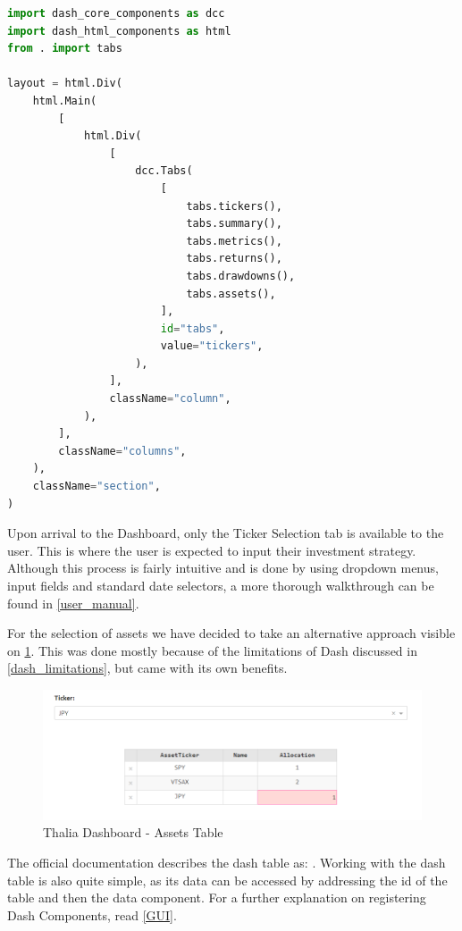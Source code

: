 \documentclass[main.tex]{subfiles}
\begin{document}
\begin{lstlisting}[language=Python, caption=layout.py - Example of Dash Code, label=lst:dash_code]
import dash_core_components as dcc
import dash_html_components as html
from . import tabs

layout = html.Div(
    html.Main(
        [
            html.Div(
                [
                    dcc.Tabs(
                        [
                            tabs.tickers(),
                            tabs.summary(),
                            tabs.metrics(),
                            tabs.returns(),
                            tabs.drawdowns(),
                            tabs.assets(),
                        ],
                        id="tabs",
                        value="tickers",
                    ),
                ],
                className="column",
            ),
        ],
        className="columns",
    ),
    className="section",
)
\end{lstlisting}

Upon arrival to the Dashboard, only the Ticker Selection tab is available to the user. This is where the user is expected to input their investment strategy. Although this process is fairly intuitive and is done by using dropdown menus, input fields and standard date selectors, a more thorough walkthrough can be found in \ref{user_manual}. 

For the selection of assets we have decided to take an alternative approach visible on \figurename{\ref{thalia_table}}. This was done mostly because of the limitations of Dash discussed in \ref{dash_limitations}, but came with its own benefits.

\begin{figure}[H]
   \centering
   \includegraphics[width=\textwidth]{08Appendices/081User/081Pictures/table.png}
   \caption{Thalia Dashboard - Assets Table}
   \label{thalia_table}
\end{figure}

The official documentation describes the dash table as:  \cite{dash_table}. Working with the dash table is also quite simple, as its data can be accessed by addressing the id of the table and then the data component. For a further explanation on registering Dash Components, read \ref{GUI}.
\end{document}

